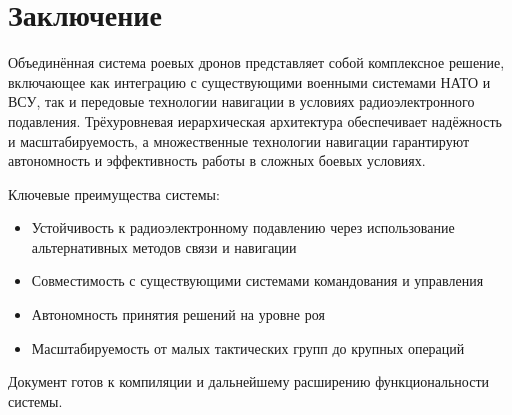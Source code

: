 \documentclass[12pt]{article}
\begin{document}
\section{Заключение}

Объединённая система роевых дронов представляет собой комплексное решение, включающее как интеграцию с существующими военными системами НАТО и ВСУ, так и передовые технологии навигации в условиях радиоэлектронного подавления. Трёхуровневая иерархическая архитектура обеспечивает надёжность и масштабируемость, а множественные технологии навигации гарантируют автономность и эффективность работы в сложных боевых условиях.

Ключевые преимущества системы:
\begin{itemize}
    \item Устойчивость к радиоэлектронному подавлению через использование альтернативных методов связи и навигации
    \item Совместимость с существующими системами командования и управления
    \item Автономность принятия решений на уровне роя
    \item Масштабируемость от малых тактических групп до крупных операций
\end{itemize}

Документ готов к компиляции и дальнейшему расширению функциональности системы.
\end{document}
